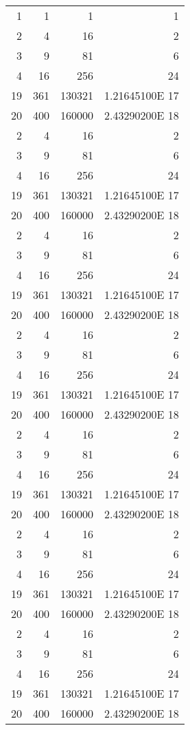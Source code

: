 \documentclass{article}
\begin{document}
\begin{center}
\begin{supertabular}{|r@{\hspace{6.5mm}}|r@{\hspace{5.5mm}}|r|r|}
1 & 1 & 1 & 1 \\
2 & 4 & 16 & 2 \\
3 & 9 & 81 & 6 \\
4 & 16 & 256 & 24 \\[5mm]
19 & 361 & 130321 & 1.21645100E 17\\
20 & 400 & 160000 & 2.43290200E 18\\
2 & 4 & 16 & 2 \\
3 & 9 & 81 & 6 \\
4 & 16 & 256 & 24 \\[5mm]
19 & 361 & 130321 & 1.21645100E 17\\
20 & 400 & 160000 & 2.43290200E 18\\
2 & 4 & 16 & 2 \\
3 & 9 & 81 & 6 \\
4 & 16 & 256 & 24 \\[5mm]
19 & 361 & 130321 & 1.21645100E 17\\
20 & 400 & 160000 & 2.43290200E 18\\
2 & 4 & 16 & 2 \\
3 & 9 & 81 & 6 \\
4 & 16 & 256 & 24 \\[5mm]
19 & 361 & 130321 & 1.21645100E 17\\
20 & 400 & 160000 & 2.43290200E 18\\
2 & 4 & 16 & 2 \\
3 & 9 & 81 & 6 \\
4 & 16 & 256 & 24 \\[5mm]
19 & 361 & 130321 & 1.21645100E 17\\
20 & 400 & 160000 & 2.43290200E 18\\2 & 4 & 16 & 2 \\
3 & 9 & 81 & 6 \\
4 & 16 & 256 & 24 \\[5mm]
19 & 361 & 130321 & 1.21645100E 17\\
20 & 400 & 160000 & 2.43290200E 18\\2 & 4 & 16 & 2 \\
3 & 9 & 81 & 6 \\
4 & 16 & 256 & 24 \\[5mm]
19 & 361 & 130321 & 1.21645100E 17\\
20 & 400 & 160000 & 2.43290200E 18\\
\end{supertabular}
\end{center}
\end{document}
